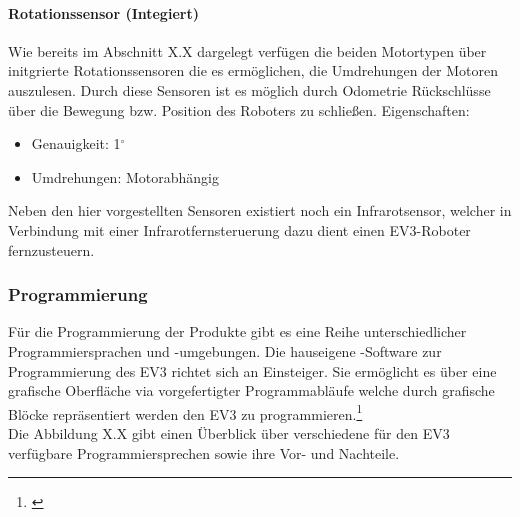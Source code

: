 \paragraph{Rotationssensor (Integiert)}
\color{finishing}
Wie bereits im Abschnitt X.X dargelegt verfügen die beiden Motortypen über initgrierte Rotationssensoren die es
ermöglichen, die Umdrehungen der Motoren auszulesen. Durch diese Sensoren ist es möglich durch Odometrie 
Rückschlüsse über die Bewegung bzw. Position des Roboters zu schließen.
\medskip
\newline
Eigenschaften:
\begin{itemize}
	\item{Genauigkeit: 1$^\circ$ }
	\item{Umdrehungen: Motorabhängig}
\end{itemize}
\bigskip
Neben den hier vorgestellten Sensoren existiert noch ein Infrarotsensor, welcher in Verbindung mit einer Infrarotfernsteruerung dazu dient einen EV3-Roboter fernzusteuern.
\subsubsection{Programmierung}
\color{process}
Für die Programmierung der \LM{} Produkte gibt es eine Reihe unterschiedlicher Programmiersprachen und -umgebungen. Die hauseigene \LE{}-Software zur Programmierung des EV3 richtet sich an Einsteiger. Sie ermöglicht es über eine grafische Oberfläche via vorgefertigter Programmabläufe welche durch grafische Blöcke repräsentiert werden den EV3 zu programmieren.\footnote{\citep[vgl.][25 f.]{Schobel.RobertaEV3Programmieren}\label{Roberta25psq}} \\
Die Abbildung X.X gibt einen Überblick über verschiedene für den EV3 verfügbare Programmiersprechen sowie ihre Vor- und Nachteile.
